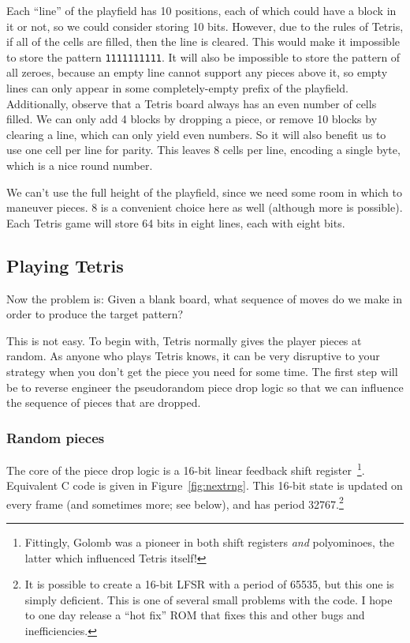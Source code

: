 \documentclass[twocolumn]{article}
\begin{document}
Each ``line'' of the playfield has 10 positions, each of which could
have a block in it or not, so we could consider storing 10 bits.
However, due to the rules of Tetris, if all of the cells are filled,
then the line is cleared. This would make it impossible to store the
pattern {\tt 1111111111}. It will also be impossible to store the
pattern of all zeroes, because an empty line cannot support any pieces
above it, so empty lines can only appear in some completely-empty
prefix of the playfield. Additionally, observe that a Tetris board
always has an even number of cells filled. We can only add 4 blocks
by dropping a piece, or remove 10 blocks by clearing a line, which
can only yield even numbers. So it will also benefit us to use
one cell per line for parity. This leaves 8 cells per line, encoding
a single byte, which is a nice round number.

We can't use the full height of the playfield, since we need some
room in which to maneuver pieces. 8 is a convenient choice here as
well (although more is possible). Each Tetris game will store 64 bits
in eight lines, each with eight bits.

\subsection{Playing Tetris}

Now the problem is: Given a blank board, what sequence of moves do
we make in order to produce the target pattern?

This is not easy. To begin with, Tetris normally gives the player
pieces at random. As anyone who plays Tetris knows, it can be very
disruptive to your strategy when you don't get the piece you need for
some time. The first step will be to reverse engineer the pseudorandom
piece drop logic so that we can influence the sequence of pieces that
are dropped.

\subsubsection{Random pieces}

The core of the piece drop logic is a 16-bit linear feedback shift
register~\cite{golomb1967shift}\footnote{Fittingly, Golomb was a
  pioneer in both shift registers {\em and} polyominoes, the latter
  which influenced Tetris itself!}. Equivalent C code is given in
Figure~\ref{fig:nextrng}. This 16-bit state is updated on every frame
(and sometimes more; see below), and has period 32767.\footnote{ It is
  possible to create a 16-bit LFSR with a period of 65535, but this
  one is simply deficient. This is one of several small problems with
  the code. I hope to one day release a ``hot fix'' ROM that fixes
  this and other bugs and inefficiencies.}
\end{document}
